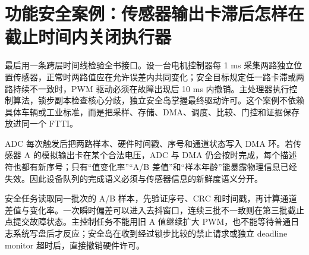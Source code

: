 \section{功能安全案例：传感器输出卡滞后怎样在截止时间内关闭执行器}

最后用一条跨层时间线检验全书接口。设一台电机控制器每 1 ms 采集两路独立位置传感器，正常时两路值应在允许误差内共同变化；安全目标规定任一路卡滞或两路持续不一致时，PWM 驱动必须在故障出现后 10 ms 内撤销。主处理器执行控制算法，锁步副本检查核心分歧，独立安全岛掌握最终驱动许可。这个案例不依赖具体车辆或工业标准，而是把采样、存储、DMA、调度、比较、门控和证据保存放进同一个 FTTI。


ADC 每次触发后把两路样本、硬件时间戳、序号和通道状态写入 DMA 环。若传感器 A 的模拟输出卡在某个合法电压，ADC 与 DMA 仍会按时完成，每个描述符也都有新序号；只有“值变化率”“A/B 差值”和“样本年龄”能暴露物理信息已经失效。因此设备队列的完成语义必须与传感器信息的新鲜度语义分开。

安全任务读取同一批次的 A/B 样本，先验证序号、CRC 和时间戳，再计算通道差值与变化率。一次瞬时偏差可以进入去抖窗口，连续三批不一致则在第三批截止点提交故障状态。主控制任务不能用旧 A 值继续扩大 PWM，也不能等待普通日志系统写盘后才反应；安全岛在收到经过锁步比较的禁止请求或独立 deadline monitor 超时后，直接撤销硬件许可。


